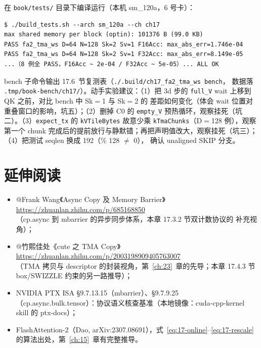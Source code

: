 在 \texttt{book/tests/} 目录下编译运行（本机 sm\_120a，6 号卡）：

\begin{lstlisting}[style=console]
$ ./build_tests.sh --arch sm_120a --ch ch17
max shared memory per block (optin): 101376 B (99.0 KB)
PASS fa2_tma_ws D=64 N=128 Sk=2 Sv=1 F16Acc: max_abs_err=1.746e-04
PASS fa2_tma_ws D=64 N=128 Sk=2 Sv=1 F32Acc: max_abs_err=8.149e-05
...（8 例全 PASS，F16Acc ~ 2e-04 / F32Acc ~ 5e-05）... ALL OK
\end{lstlisting}

bench 子命令输出 17.6~节复测表（\texttt{.\allowbreak{}/\allowbreak{}.\allowbreak{}build/\allowbreak{}ch17\_\allowbreak{}fa2\_\allowbreak{}tma\_\allowbreak{}ws bench}，
数据落 \texttt{.\allowbreak{}tmp/\allowbreak{}book-bench/\allowbreak{}ch17/\allowbreak{}}）。动手实验建议：（1）把 3d 步的
\texttt{full\_V} wait 上移到 QK 之前，对比 bench 中 Sk$=$1 与 Sk$=$2 的
差距如何变化（体会 wait 位置对重叠窗口的影响，坑五）；（2）删掉 C0 的
\texttt{empty\_V} 预热循环，观察挂死（坑二）。（3）\texttt{expect\_tx} 的
\texttt{kVTileBytes} 故意少乘 \texttt{kTmaChunks}（D$=$128 例），观察
第一个 chunk 完成后的提前放行与静默错；再把声明值改大，观察挂死（坑三）；
（4）把测试 seqlen 换成 192（$\%$ 128 $\ne$ 0），
确认 unaligned SKIP 分支。

\section*{延伸阅读}

\begin{itemize}
  \item @Frank Wang《Async Copy 及 Memory Barrier》\\
        \url{https://zhuanlan.zhihu.com/p/685168850}\\
        （cp.async 到 mbarrier 的异步同步体系，本章 17.3.2 节双计数协议的
        补充视角）；
  \item @竹熙佳处《cute 之 TMA Copy》\\
        \url{https://zhuanlan.zhihu.com/p/2003198909405763007}\\
        （TMA 拷贝与 descriptor 的封装视角，第~\ref{ch:23}~章的先导；本章
        17.4.3 节 box/SWIZZLE 约束的另一路推导）；
  \item NVIDIA PTX ISA §9.7.13.15（mbarrier）、§9.7.9.25
        （cp.async.bulk.tensor）：协议语义核查基准（本地镜像：cuda-cpp-kernel
        skill 的 ptx-docs）；
  \item FlashAttention-2（Dao, arXiv:2307.08691），式~\ref{eq:17-online}--\ref{eq:17-rescale}
        的算法出处，第~\ref{ch:15}~章有完整推导。
\end{itemize}

